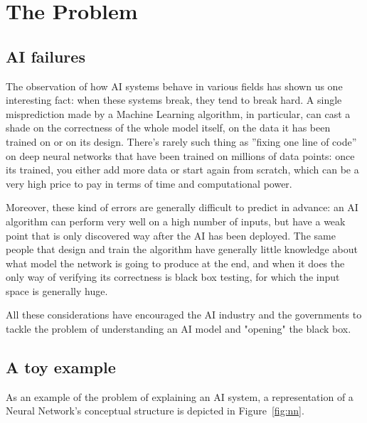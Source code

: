 \documentclass[conference]{IEEEtran}
\begin{document}
\section{The Problem}
\label{sec:theproblem}

\subsection{AI failures}
\label{sec:aifails}

The observation of how AI systems behave in various fields has shown
us one interesting fact: when these systems break, they tend to break hard. A single
misprediction made by a Machine Learning algorithm, in particular, can cast a shade on the correctness of the whole model
itself, on the data it has been trained on or on its design. There's rarely such
thing as ''fixing one line of code'' on deep neural networks that have been
trained on millions of data points: once its trained, you either add more data
or start again from scratch, which can be a very high price to pay in terms of
time and computational power.


Moreover, these kind of errors are generally difficult to predict in advance: an
AI algorithm can perform very well on a high number of inputs, but have a weak
point that is only discovered way after the AI has been deployed. The same people that design and train the algorithm have generally little
knowledge about what model the network is going to produce at the end, and when
it does the only way of verifying its correctness is black box testing, for
which the input space is generally huge.

All these considerations have encouraged the AI industry and the governments to
tackle the problem of understanding an AI model and "opening" the black box.

\subsection{A toy example}
\label{sec:example}

As an example of the problem of explaining an AI system, a representation of a Neural Network's conceptual structure is depicted in Figure~\ref{fig:nn}.
\end{document}
